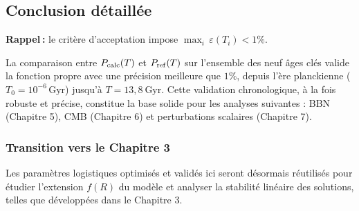 \subsection{Conclusion détaillée}

\noindent\textbf{Rappel :} le critère d’acceptation impose
\(\max_{i}\,\varepsilon(T_i)<1\%\).

La comparaison entre \(P_{\rm calc}(T)\) et \(P_{\rm ref}(T)\) sur l’ensemble des neuf âges clés valide la fonction propre avec une précision meilleure que \(1\%\), depuis l’ère planckienne (\(T_{0}=10^{-6}\,\mathrm{Gyr}\)) jusqu’à \(T=13{,}8\) Gyr.
Cette validation chronologique, à la fois robuste et précise, constitue la base solide pour les analyses suivantes : BBN (Chapitre 5), CMB (Chapitre 6) et perturbations scalaires (Chapitre 7).

\subsubsection*{Transition vers le Chapitre 3}

Les paramètres logistiques optimisés et validés ici seront désormais réutilisés pour étudier l’extension \(f(R)\) du modèle et analyser la stabilité linéaire des solutions, telles que développées dans le Chapitre 3.

